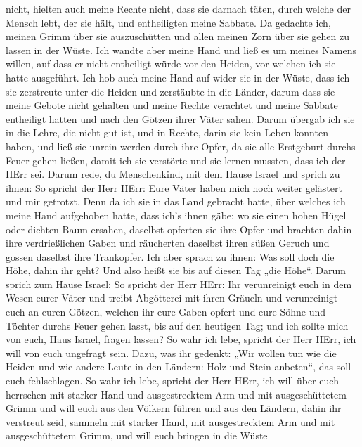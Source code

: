 nicht, hielten auch meine Rechte nicht, dass sie darnach täten, durch
welche der Mensch lebt, der sie hält, und entheiligten meine Sabbate. Da
gedachte ich, meinen Grimm über sie auszuschütten und allen meinen Zorn
über sie gehen zu lassen in der Wüste.  Ich wandte aber
meine Hand und ließ es um meines Namens willen, auf dass er nicht
entheiligt würde vor den Heiden, vor welchen ich sie hatte ausgeführt.
 Ich hob auch meine Hand auf wider sie in der Wüste, dass
ich sie zerstreute unter die Heiden und zerstäubte in die Länder,
 darum dass sie meine Gebote nicht gehalten und meine
Rechte verachtet und meine Sabbate entheiligt hatten und nach den Götzen
ihrer Väter sahen.  Darum übergab ich sie in die Lehre, die
nicht gut ist, und in Rechte, darin sie kein Leben konnten haben,
 und ließ sie unrein werden durch ihre Opfer, da sie alle
Erstgeburt durchs Feuer gehen ließen, damit ich sie verstörte und sie
lernen mussten, dass ich der HErr sei.  Darum rede, du
Menschenkind, mit dem Hause Israel und sprich zu ihnen: So spricht der
Herr HErr: Eure Väter haben mich noch weiter gelästert und mir getrotzt.
 Denn da ich sie in das Land gebracht hatte, über welches
ich meine Hand aufgehoben hatte, dass ich's ihnen gäbe: wo sie einen
hohen Hügel oder dichten Baum ersahen, daselbst opferten sie ihre Opfer
und brachten dahin ihre verdrießlichen Gaben und räucherten daselbst
ihren süßen Geruch und gossen daselbst ihre Trankopfer. 
Ich aber sprach zu ihnen: Was soll doch die Höhe, dahin ihr geht? Und
also heißt sie bis auf diesen Tag „die Höhe``.  Darum
sprich zum Hause Israel: So spricht der Herr HErr: Ihr verunreinigt euch
in dem Wesen eurer Väter und treibt Abgötterei mit ihren Gräueln
 und verunreinigt euch an euren Götzen, welchen ihr eure
Gaben opfert und eure Söhne und Töchter durchs Feuer gehen lasst, bis
auf den heutigen Tag; und ich sollte mich von euch, Haus Israel, fragen
lassen? So wahr ich lebe, spricht der Herr HErr, ich will von euch
ungefragt sein.  Dazu, was ihr gedenkt: „Wir wollen tun wie
die Heiden und wie andere Leute in den Ländern: Holz und Stein
anbeten``, das soll euch fehlschlagen.  So wahr ich lebe,
spricht der Herr HErr, ich will über euch herrschen mit starker Hand und
ausgestrecktem Arm und mit ausgeschüttetem Grimm  und will
euch aus den Völkern führen und aus den Ländern, dahin ihr verstreut
seid, sammeln mit starker Hand, mit ausgestrecktem Arm und mit
ausgeschüttetem Grimm,  und will euch bringen in die Wüste
